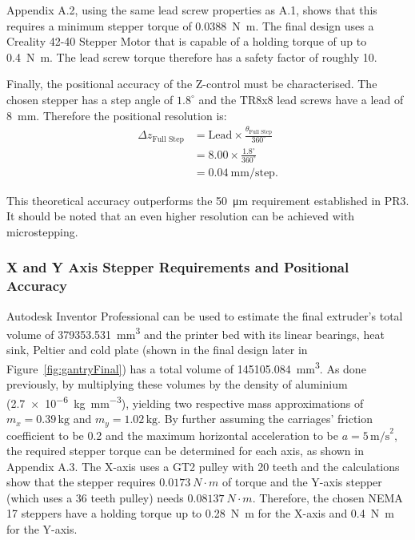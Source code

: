 Appendix A.2, using the same lead screw properties as A.1, shows that this requires a minimum stepper torque of \SI{0.0388}{\newton\meter}. The final design uses a Creality 42-40 Stepper Motor that is capable of a holding torque of up to \SI{0.4}{\newton\meter}. The lead screw torque therefore has a safety factor of roughly 10.

Finally, the positional accuracy of the Z-control must be characterised. The chosen stepper has a step angle of $1.8^\circ$ and the TR8x8 lead screws have a lead of \SI{8}{mm}. Therefore the positional resolution is:
\begin{align*}
\Delta z_{\text{Full Step}} &= \text{Lead} \times \frac{\theta_{\text{Full Step}}}{360^{\circ}} \\
&=8.00\times \frac{1.8^\circ}{360^\circ} \\
&= 0.04~\text{mm}/\text{step}.
\end{align*}

\noindent This theoretical accuracy outperforms the \SI{50}{\micro\meter} requirement established in PR3. It should be noted that an even higher resolution can be achieved with microstepping.

\subsubsection*{X and Y Axis Stepper Requirements and Positional Accuracy}
Autodesk Inventor Professional can be used to estimate the final extruder's total volume of \SI{379353.531}{\milli\meter^3} and the printer bed with its linear bearings, heat sink, Peltier and cold plate (shown in the final design later in Figure~\ref{fig:gantryFinal}) has a total volume of \SI{145105.084}{\milli\meter^3}. As done previously, by multiplying these volumes by the density of aluminium (\SI{2.7e-6}{\kilogram\per\milli\meter^{3}}), yielding two respective mass approximations of \( m_x = 0.39\,\text{kg} \) and \( m_y = 1.02\,\text{kg}\). By further assuming the carriages' friction coefficient to be 0.2 and the maximum horizontal acceleration to be \( a = 5\,\text{m/s}^2 \), the required stepper torque can be determined for each axis, as shown in Appendix A.3. The X-axis uses a GT2 pulley with 20 teeth and the calculations show that the stepper requires $0.0173~N\cdot m$ of torque and the Y-axis stepper (which uses a 36 teeth pulley) needs $0.08137~N\cdot m$. Therefore, the chosen NEMA 17 steppers have a holding torque up to \SI{0.28}{\newton\meter} for the X-axis and \SI{0.4}{\newton\meter} for the Y-axis.

